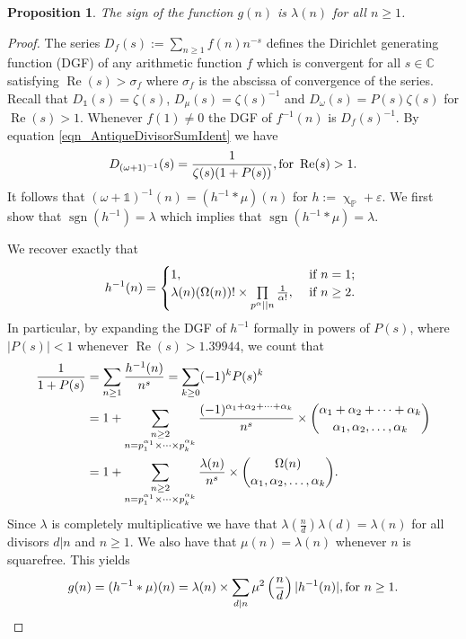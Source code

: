 \documentclass[11pt,reqno,a4letter]{article}
\numberwithin{equation}{section}
\numberwithin{figure}{section}
\numberwithin{table}{section}
\newcommand{\cf}{cf.~}
\renewcommand{\chi}{\upchi}
\theoremstyle{plain}
\newtheorem{prop}[theorem]{Proposition}
\numberwithin{theorem}{section}
\theoremstyle{definition}
\theoremstyle{remark}
\renewcommand{\Re}{\operatorname{Re}}
\newcommand{\mathtext}[1]{\text{\rm #1}}
\begin{document}
\begin{prop}
\label{prop_SignageDirInvsOfPosBddArithmeticFuncs_v1} 
The sign of the function $g(n)$ is $\lambda(n)$ for all $n \geq 1$. 
\end{prop} 
\begin{proof} 
The series $D_f(s) := \sum_{n \geq 1} f(n) n^{-s}$ defines the 
Dirichlet generating function (DGF) of any 
arithmetic function $f$ which is convergent for all $s \in \mathbb{C}$ satisfying 
$\Re(s) > \sigma_f$ where $\sigma_f$ is the abscissa of convergence of the series. 
Recall that $D_{\mathds{1}}(s) = \zeta(s)$, $D_{\mu}(s) = \zeta(s)^{-1}$ and 
$D_{\omega}(s) = P(s) \zeta(s)$ for $\Re(s) > 1$. 
Whenever $f(1) \neq 0$ the DGF of $f^{-1}(n)$ is $D_f(s)^{-1}$. 
By equation \eqref{eqn_AntiqueDivisorSumIdent} we have 
\begin{align} 
\label{eqn_DGF_of_gInvn} 
D_{(\omega+1)^{-1}}(s) = \frac{1}{\zeta(s) (1+P(s))}, \mathtext{ for } \Re(s) > 1. 
\end{align} 
It follows that $(\omega + \mathds{1})^{-1}(n) = (h^{-1} \ast \mu)(n)$ for 
$h := \chi_{\mathbb{P}} + \varepsilon$. 
We first show that $\operatorname{sgn}(h^{-1}) = \lambda$ which implies that 
$\operatorname{sgn}(h^{-1} \ast \mu) = \lambda$. 

We recover exactly that \cite[\cf \S 2]{FROBERG-1968} 
\begin{equation} 
\notag 
h^{-1}(n) = \begin{cases} 
     1, & \text{ if $n = 1$; } \\ 
     \lambda(n) (\Omega(n))! \times \prod\limits_{p^{\alpha} || n} \frac{1}{\alpha!}, & 
     \text{ if $n \geq 2$. }
     \end{cases}
\end{equation} 
In particular, by expanding the DGF of 
$h^{-1}$ formally in powers of $P(s)$, where $|P(s)| < 1$ whenever $\Re(s) > 1.39944$, 
we count that 
\begin{align}
\notag
\frac{1}{1+P(s)} & = \sum_{n \geq 1} \frac{h^{-1}(n)}{n^s} = \sum_{k \geq 0} (-1)^k P(s)^k \\ 
\notag
     & = 
     1 + \sum_{\substack{n \geq 2 \\ n =p_1^{\alpha_1} \times \cdots \times p_k^{\alpha_k}}} 
     \frac{(-1)^{\alpha_1+\alpha_2+\cdots+\alpha_k}}{n^s} \times 
     \binom{\alpha_1+\alpha_2+\cdots+\alpha_k}{\alpha_1,\alpha_2,\ldots,\alpha_k} \\ 
\label{eqn_COmeganMultinomExp_as_DGFSeries_v2}
     & = 
     1 + \sum_{\substack{n \geq 2 \\ n =p_1^{\alpha_1} \times \cdots \times p_k^{\alpha_k}}} 
     \frac{\lambda(n)}{n^s} \times \binom{\Omega(n)}{\alpha_1,\alpha_2,\ldots,\alpha_k}. 
\end{align}
Since $\lambda$ is completely multiplicative we have that 
$\lambda\left(\frac{n}{d}\right) \lambda(d) = \lambda(n)$ for all divisors 
$d|n$ and $n \geq 1$. We also have that $\mu(n) = \lambda(n)$ 
whenever $n$ is squarefree. This yields 
\[
g(n) = (h^{-1} \ast \mu)(n) = \lambda(n) \times 
     \sum_{d|n} \mu^2\left(\frac{n}{d}\right) |h^{-1}(n)|, \mathtext{ for } n \geq 1. 
     \qedhere 
\]
\end{proof} 
\end{document}
